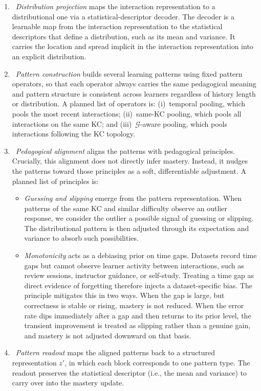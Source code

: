\documentclass[conference]{IEEEtran}
\begin{document}
\begin{enumerate}
    \item~\emph{Distribution projection} maps the interaction representation to a distributional one via a statistical-descriptor decoder. The decoder is a learnable map from the interaction representation to the statistical descriptors that define a distribution, such as its mean and variance. It carries the location and spread implicit in the interaction representation into an explicit distribution.
    \item~\emph{Pattern construction} builds several learning patterns using fixed pattern operators, so that each operator always carries the same pedagogical meaning and pattern structure is consistent across learners regardless of history length or distribution. A planned list of operators is: (i)~temporal pooling, which pools the most recent interactions; (ii)~same-KC pooling, which pools all interactions on the same KC; and (iii)~$\mathcal{G}$-aware pooling, which pools interactions following the KC topology.
    \item~\emph{Pedagogical alignment} aligns the patterns with pedagogical principles. Crucially, this alignment does not directly infer mastery. Instead, it nudges the patterns toward those principles as a soft, differentiable adjustment. A planned list of principles is:
    \begin{itemize}
        \item \emph{Guessing and slipping} emerge from the pattern representation. When patterns of the same KC and similar difficulty observe an outlier response, we consider the outlier a possible signal of guessing or slipping. The distributional pattern is then adjusted through its expectation and variance to absorb such possibilities.
        \item \emph{Monotonicity} acts as a debiasing prior on time gaps. Datasets record time gaps but cannot observe learner activity between interactions, such as review sessions, instructor guidance, or self-study. Treating a time gap as direct evidence of forgetting therefore injects a dataset-specific bias. The principle mitigates this in two ways. When the gap is large, but correctness is stable or rising, mastery is not reduced. When the error rate dips immediately after a gap and then returns to its prior level, the transient improvement is treated as slipping rather than a genuine gain, and mastery is not adjusted downward on that basis.
    \end{itemize}
    \item~\emph{Pattern readout} maps the aligned patterns back to a structured representation $z'$, in which each block corresponds to one pattern type. The readout preserves the statistical descriptor (i.e., the mean and variance) to carry over into the mastery update.
\end{enumerate}
\end{document}

